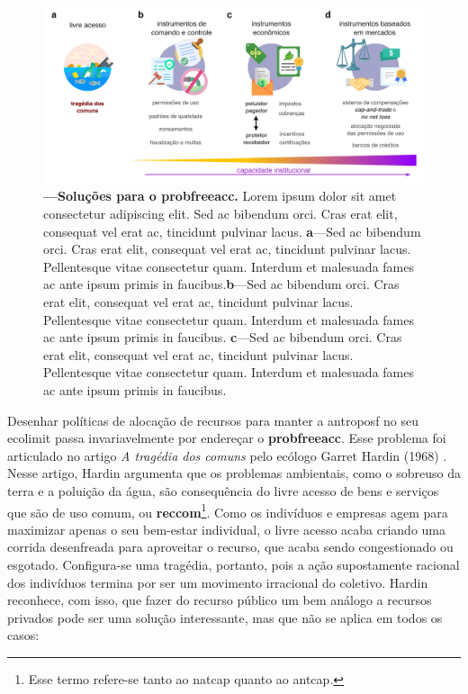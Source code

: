 \documentclass[./main.tex]{subfiles}
\begin{document}
\begin{figure}[t!] 
\centering				
\includegraphics[width=0.98\linewidth]{figs/fig_opensacc.jpg}		
\caption[Soluções para o problema do livre acesso]
{\textbf{---\;Soluções para o \gls{probfreeacc}.}
    Lorem ipsum dolor sit amet consectetur adipiscing elit. Sed ac bibendum orci. Cras erat elit, consequat vel erat ac, tincidunt pulvinar lacus. \;\textbf{a}\;---\;Sed ac bibendum orci. Cras erat elit, consequat vel erat ac, tincidunt pulvinar lacus. Pellentesque vitae consectetur quam. Interdum et malesuada fames ac ante ipsum primis in faucibus.\;\textbf{b}\;---\;Sed ac bibendum orci. Cras erat elit, consequat vel erat ac, tincidunt pulvinar lacus. Pellentesque vitae consectetur quam. Interdum et malesuada fames ac ante ipsum primis in faucibus. \;\textbf{c}\;---\;Sed ac bibendum orci. Cras erat elit, consequat vel erat ac, tincidunt pulvinar lacus. Pellentesque vitae consectetur quam. Interdum et malesuada fames ac ante ipsum primis in faucibus.
}
\label{fig:eco:tragedy} 		
\end{figure}

\par Desenhar políticas de alocação de recursos para manter a \gls{antroposf} no seu \gls{ecolimit} passa invariavelmente por endereçar o \textbf{\gls{probfreeacc}}. Esse problema foi articulado no artigo \textit{A tragédia dos comuns} pelo ecólogo Garret Hardin (1968) \cite{Hardin1968a}. Nesse artigo, Hardin argumenta que os problemas ambientais, como o sobreuso da terra e a poluição da água, são consequência do livre acesso de bens e serviços que são de uso comum, ou \textbf{\gls{reccom}}\footnote{Esse termo refere-se tanto ao \gls{natcap} quanto ao \gls{antcap}.}. Como os indivíduos e empresas agem para maximizar apenas o seu bem-estar individual, o livre acesso acaba criando uma corrida desenfreada para aproveitar o recurso, que acaba sendo congestionado ou esgotado. Configura-se uma tragédia, portanto, pois a ação supostamente racional dos indivíduos termina por ser um movimento irracional do coletivo. Hardin reconhece, com isso, que fazer do recurso público um bem análogo a recursos privados pode ser uma solução interessante, mas que não se aplica em todos os casos:
\end{document}

